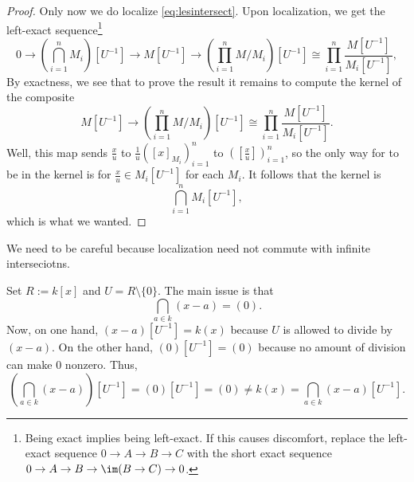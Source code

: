\begin{proof}
	Only now we do localize \autoref{eq:lesintersect}. Upon localization, we get the left-exact sequence\footnote{Being exact implies being left-exact. If this causes discomfort, replace the left-exact sequence $0\to A\to B\to C$ with the short exact sequence $0\to A\to B\to\im(B\to C)\to0$.}
	\[0\to\left(\bigcap_{i=1}^nM_i\right)\left[U^{-1}\right]\to M\left[U^{-1}\right]\to\left(\prod_{i=1}^nM/M_i\right)\left[U^{-1}\right]\cong\prod_{i=1}^n\frac{M\left[U^{-1}\right]}{M_i\left[U^{-1}\right]},\]
	By exactness, we see that to prove the result it remains to compute the kernel of the composite
	\[M\left[U^{-1}\right]\to\left(\prod_{i=1}^nM/M_i\right)\left[U^{-1}\right]\cong\prod_{i=1}^n\frac{M\left[U^{-1}\right]}{M_i\left[U^{-1}\right]}.\]
	Well, this map sends $\frac xu$ to $\frac1u([x]_{M_i})_{i=1}^n$ to $\left([\frac xu]\right)_{i=1}^n$, so the only way for to be in the kernel is for $\frac xu\in M_i\left[U^{-1}\right]$ for each $M_i$. It follows that the kernel is
	\[\bigcap_{i=1}^nM_i\left[U^{-1}\right],\]
	which is what we wanted.
\end{proof}
We need to be careful because localization need not commute with infinite interseciotns.
\begin{example}
	Set $R:=k[x]$ and $U=R\setminus\{0\}$. The main issue is that
	\[\bigcap_{a\in k}(x-a)=(0).\]
	Now, on one hand, $(x-a)\left[U^{-1}\right]=k(x)$ because $U$ is allowed to divide by $(x-a)$. On the other hand, $(0)\left[U^{-1}\right]=(0)$ because no amount of division can make $0$ nonzero. Thus,
	\[\left(\bigcap_{a\in k}(x-a)\right)\left[U^{-1}\right]=(0)\left[U^{-1}\right]=(0)\ne k(x)=\bigcap_{a\in k}(x-a)\left[U^{-1}\right].\]
\end{example}

